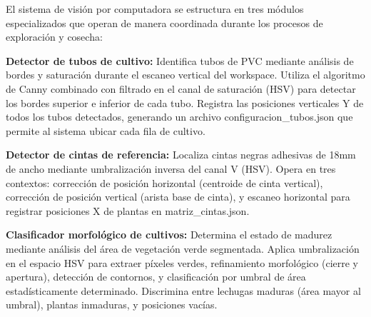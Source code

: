 El sistema de visión por computadora se estructura en tres módulos especializados que operan de manera coordinada durante los procesos de exploración y cosecha:

\textbf{Detector de tubos de cultivo:} Identifica tubos de PVC mediante análisis de bordes y saturación durante el escaneo vertical del workspace. Utiliza el algoritmo de Canny combinado con filtrado en el canal de saturación (HSV) para detectar los bordes superior e inferior de cada tubo. Registra las posiciones verticales Y de todos los tubos detectados, generando un archivo configuracion\_tubos.json que permite al sistema ubicar cada fila de cultivo.

\textbf{Detector de cintas de referencia:} Localiza cintas negras adhesivas de 18mm de ancho mediante umbralización inversa del canal V (HSV). Opera en tres contextos: corrección de posición horizontal (centroide de cinta vertical), corrección de posición vertical (arista base de cinta), y escaneo horizontal para registrar posiciones X de plantas en matriz\_cintas.json.

\textbf{Clasificador morfológico de cultivos:} Determina el estado de madurez mediante análisis del área de vegetación verde segmentada. Aplica umbralización en el espacio HSV para extraer píxeles verdes, refinamiento morfológico (cierre y apertura), detección de contornos, y clasificación por umbral de área estadísticamente determinado. Discrimina entre lechugas maduras (área mayor al umbral), plantas inmaduras, y posiciones vacías.
